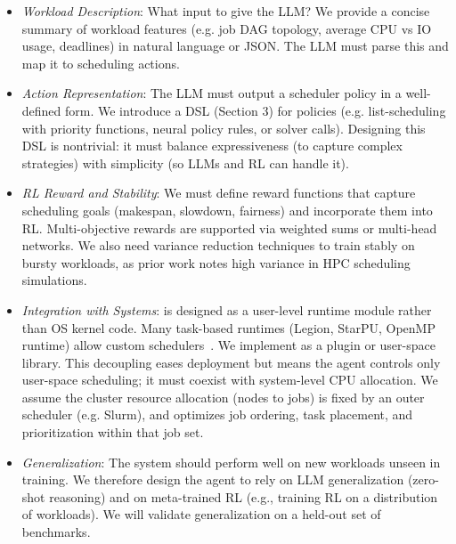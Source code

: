 \begin{itemize}
\item \emph{Workload Description}: What input to give the LLM? We provide a concise summary of workload features (e.g. job DAG topology, average CPU vs IO usage, deadlines) in natural language or JSON. The LLM must parse this and map it to scheduling actions.
\item \emph{Action Representation}: The LLM must output a scheduler policy in a well-defined form. We introduce a DSL (Section 3) for policies (e.g. list-scheduling with priority functions, neural policy rules, or solver calls). Designing this DSL is nontrivial: it must balance expressiveness (to capture complex strategies) with simplicity (so LLMs and RL can handle it).
\item \emph{RL Reward and Stability}: We must define reward functions that capture scheduling goals (makespan, slowdown, fairness) and incorporate them into RL. Multi-objective rewards are supported via weighted sums or multi-head networks. We also need variance reduction techniques to train stably on bursty workloads, as prior work notes high variance in HPC scheduling simulations.
\item \emph{Integration with Systems}: \sys{} is designed as a user-level runtime module rather than OS kernel code. Many task-based runtimes (Legion, StarPU, OpenMP runtime) allow custom schedulers~\cite{arxiv2404}. We implement \sys{} as a plugin or user-space library. This decoupling eases deployment but means the agent controls only user-space scheduling; it must coexist with system-level CPU allocation. We assume the cluster resource allocation (nodes to jobs) is fixed by an outer scheduler (e.g. Slurm), and \sys{} optimizes job ordering, task placement, and prioritization within that job set.
\item \emph{Generalization}: The system should perform well on new workloads unseen in training. We therefore design the agent to rely on LLM generalization (zero-shot reasoning) and on meta-trained RL (e.g., training RL on a distribution of workloads). We will validate generalization on a held-out set of benchmarks.
\end{itemize}